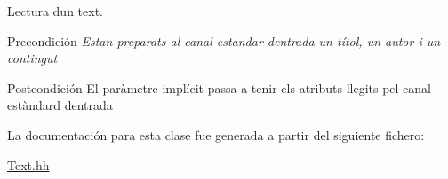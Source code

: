 Lectura d\textquotesingle{}un text. 

\begin{DoxyPrecond}{Precondición}
{\itshape Estan preparats al canal estandar d\textquotesingle{}entrada un títol, un autor i un contingut} 
\end{DoxyPrecond}
\begin{DoxyPostcond}{Postcondición}
El paràmetre implícit passa a tenir els atributs llegits pel canal estàndard d\textquotesingle{}entrada 
\end{DoxyPostcond}


La documentación para esta clase fue generada a partir del siguiente fichero\+:\begin{DoxyCompactItemize}
\item 
\hyperlink{_text_8hh}{Text.\+hh}\end{DoxyCompactItemize}
